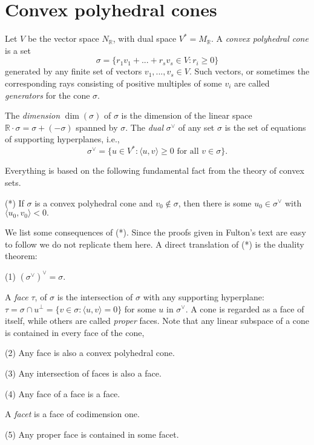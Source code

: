 \documentclass[10pt,a4paper]{book}
\newcommand{\jarek}[1]{\todo[color=green!40]{JB: #1}}             %
\newcommand{\on}{\operatorname}
\begin{document}
\section{Convex polyhedral cones}
\jarek{A definicja $N$ oraz $M$?}
Let $V$ be the vector space $N_\mathbb{R}$, with dual space $V^* = M_\mathbb{R}$. A \textit{convex polyhedral cone} is a set 
\[
\sigma = \{r_1v_1+...+r_sv_s\in V: r_i\geq 0\}
\]
generated by any finite set of vectors $v_1,..., v_s \in V$. Such vectors, or sometimes the corresponding rays consisting of positive multiples of some $v_i$ are called \textit{generators} for the cone $\sigma$.


The \textit{dimension} $\on{dim}(\sigma)$ of $\sigma$ is the dimension of the linear space $\mathbb{R}\cdot \sigma = \sigma  + (-\sigma)$ spanned by $\sigma$. The \textit{dual} $\sigma^\vee$ of any set $\sigma$ is the set of equations of supporting hyperplanes, i.e.,
\[
\sigma^\vee = \{u\in V^*: \langle u,v \rangle \geq 0 \text{ for all }v\in \sigma\}.
\]

Everything is based on the following fundamental fact from the theory of convex sets.

\smallskip
\noindent (*) If  $\sigma$ is a convex polyhedral cone and  $v_0\notin \sigma$, then there is some  $u_0 \in \sigma^\vee$ with $\langle u_0, v_0 \rangle < 0.$
\smallskip

We list some consequences of (*). Since the proofs given in Fulton's text are easy to follow we do not replicate them here.
A direct translation of (*) is the duality theorem:

\smallskip
\noindent (1) $(\sigma^\vee)^\vee = \sigma.$
\smallskip

A \textit{face} $\tau$, of $\sigma$ is the intersection of $\sigma$ with any supporting hyperplane: $\tau= \sigma\cap u^\perp =\{v\in \sigma :\langle u, v \rangle = 0\}$ for some $u$ in $\sigma^\vee$. A cone is regarded as a face of itself, while others are called \textit{proper} faces. Note that any linear subspace of a cone is contained in every face of the cone,

\smallskip
\noindent (2) Any face is also a convex polyhedral cone. 
\smallskip

\smallskip
\noindent (3) Any intersection of faces is also a face.
\smallskip

\smallskip
\noindent (4) Any face of a face is a face.
\smallskip

A \textit{facet} is a face of codimension one.

\smallskip
\noindent (5) Any proper face is contained in some facet.
\smallskip
\end{document}
